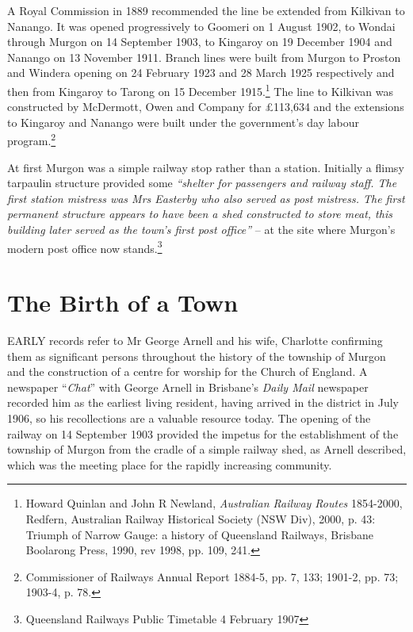 A Royal Commission in 1889 recommended the line be extended from Kilkivan to Nanango. It was opened progressively to Goomeri on 1 August 1902, to Wondai through Murgon on 14 September 1903, to Kingaroy on 19 December 1904 and Nanango on 13 November 1911. Branch lines were built from Murgon to Proston and Windera opening on 24 February 1923 and 28 March 1925 respectively and then from Kingaroy to Tarong on 15 December 1915.\footnote{Howard Quinlan and John R Newland, \emph{Australian Railway Routes} 1854-2000, Redfern, Australian Railway Historical Society (NSW Div), 2000, p. 43: Triumph of Narrow Gauge: a history of Queensland Railways, Brisbane Boolarong Press, 1990, rev 1998, pp. 109, 241.} The line to Kilkivan was constructed by McDermott, Owen and Company for \pounds113,634 and the extensions to Kingaroy and Nanango were built under the government's day labour program.\footnote{Commissioner of Railways Annual Report 1884-5, pp. 7, 133; 1901-2, pp. 73; 1903-4, p. 78.}


At first Murgon was a simple railway stop rather than a station. Initially a flimsy tarpaulin structure provided some \emph{``shelter for passengers and railway staff. The first station mistress was Mrs Easterby who also served as post mistress. The first permanent structure appears to have been a shed constructed to store meat, this building later served as the town's first post office''} -- at the site where Murgon's modern post office now stands.\footnote{Queensland Railways Public Timetable 4 February 1907}


\printendnotes[custom]
\setcounter{endnote}{0}




\chapter{The Birth of a Town}
\nobalance


\lettrine[lines=3]{E}{ARLY}
 records refer to Mr George Arnell and his wife, Charlotte confirming them as significant persons throughout the history of the township of Murgon and the construction of a centre for worship for the Church of England. A newspaper ``\emph{Chat}'' with George Arnell in Brisbane's \emph{Daily Mail} newspaper recorded him as the earliest living resident\emph{,} having arrived in the district in July 1906, so his recollections are a valuable resource today. The opening of the railway on 14 September 1903 provided the impetus for the establishment of the township of Murgon from the cradle of a simple railway shed, as Arnell described, which was the meeting place for the rapidly increasing community.

